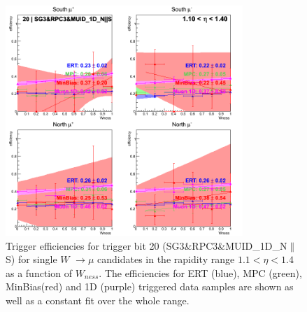 \begin{figure}[h!]

  \centering

  \includegraphics[width=0.8\textwidth]{./figures/run13_trigeffisn_eta0_trig20_lin.png}
  \caption{\label{fig:run13_trigeffisn_eta0_nper0_trig20_lin} Trigger efficiencies for trigger bit 20 (SG3\&RPC3\&MUID\_1D\_N$\|$S) for single $W$ $\rightarrow \mu$ candidates in the rapidity range $ 1.1 < \eta < 1.4$ as a function of $W_{ness}$. The efficiencies for ERT (blue), MPC (green), MinBias(red) and 1D (purple) triggered data samples are shown as well as a constant fit over the whole range.}

\end{figure}
\clearpage
